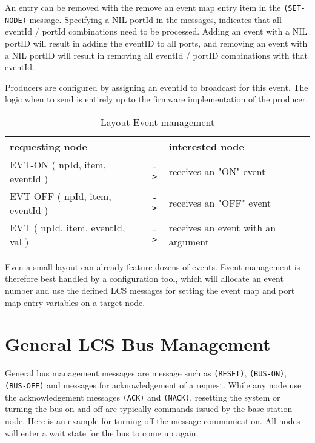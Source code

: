 An entry can be removed with the remove an event map entry item in the \texttt{(SET-NODE)} message. Specifying a NIL portId in the messages, indicates that all eventId / portId combinations need to be processed. Adding an event with a NIL portID will result in adding the eventID to all ports, and removing an event with a NIL portID will result in removing all eventId / portID combinations with that eventId.

Producers are configured by assigning an eventId to broadcast for this event. The logic when to send is entirely up to the firmware implementation of the producer.

\begin{table}[ht!]
    \begin{center}
        \caption{Layout Event management}
        \begin{tabular}{|p{} c p{}|}
            \toprule
            \textbf{requesting node} & & \textbf{ interested node} \\
            \midrule
            EVT-ON ( npId, item, eventId ) & \texttt{->} & receives an "ON" event \\
            EVT-OFF ( npId, item, eventId ) & \texttt{->} & receives an "OFF" event \\
            \midrule
            EVT ( npId, item, eventId, val ) & \texttt{->} & receives an event with an argument \\
            \bottomrule
        \end{tabular}
    \end{center}
\end{table}

Even a small layout can already feature dozens of events. Event management is therefore best handled by a configuration tool, which will allocate an event number and use the defined LCS messages for setting the event map and port map entry variables on a target node.

\section{General LCS Bus Management}

General bus management messages are message such as \texttt{(RESET)}, \texttt{(BUS-ON)}, \texttt{(BUS-OFF)} and messages for acknowledgement of a request. While any node use the acknowledgement messages \texttt{(ACK)} and \texttt{(NACK)}, resetting the system or turning the bus on and off are typically commands issued by the base station node. Here is an example for turning off the message communication. All nodes will enter a wait state for the bus to come up again.

